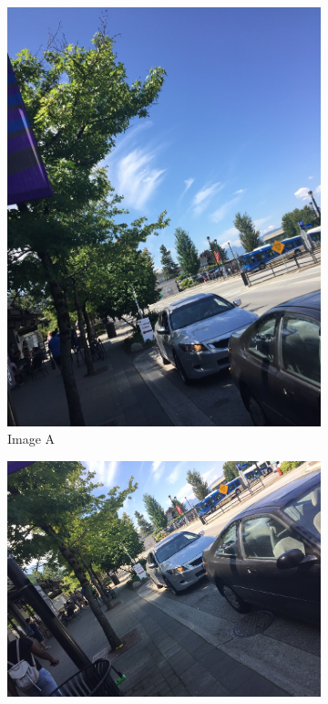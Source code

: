 \documentclass[]{article}
\begin{document}
\begin{figure}[h]
	\begin{subfigure}[h]{0.2\textwidth}
		\includegraphics[scale=0.15]{results/1}
		\centering
		\caption{Image A}
	\end{subfigure}%
	\hfill
	\begin{subfigure}[h]{0.2\textwidth}
		\includegraphics[scale=0.15]{results/2}

\end{subfigure}
\end{figure}
\end{document}
